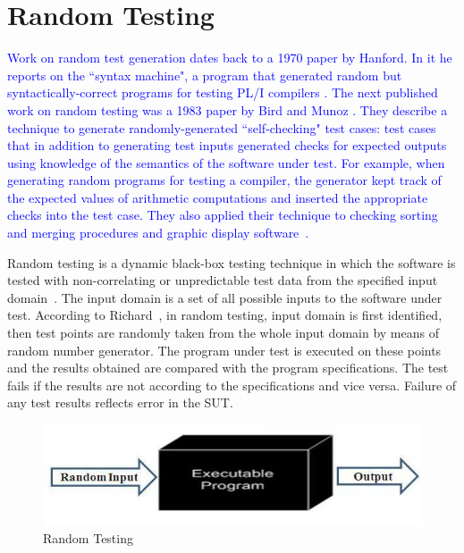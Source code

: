 \chapter{Random Testing}
\label{chap:randomTesting}


\textcolor{blue}{Work on random test generation dates back to a 1970 paper by Hanford. In it he reports on the ``syntax machine", a program that generated random but syntactically-correct programs for testing PL/I compilers \cite{hanford1970automatic}. The next published work on random testing was a 1983 paper by Bird and Munoz \cite{bird1983automatic}. They describe a technique to
generate randomly-generated ``self-checking" test cases: test cases that in addition to generating test inputs generated checks for expected outputs using knowledge of the semantics of the software under test. For example, when generating random programs for testing a compiler, the generator kept track of the expected values of arithmetic computations and inserted the appropriate checks into the test case. They also applied their technique to checking sorting and merging procedures and graphic display software~\cite{pacheco2009directed}.}


Random testing is a dynamic black-box testing technique in which the software is tested with non-correlating or unpredictable test data from the specified input domain~\cite{Chan2002}. The input domain is a set of all possible inputs to the software under test. According to Richard~\cite{hamlet1994}, in random testing, input domain is first identified, then test points are randomly taken from the whole input domain by means of random number generator. The program under test is executed on these points and the results obtained are compared with the program specifications. The test fails if the results are not according to the specifications and vice versa. Failure of any test results reflects error in the SUT.

\begin{figure}[h]
	\centering
	\includegraphics[scale=0.5]{chapter3/randomTesting.jpg}
	\caption{Random Testing}
\end{figure}

